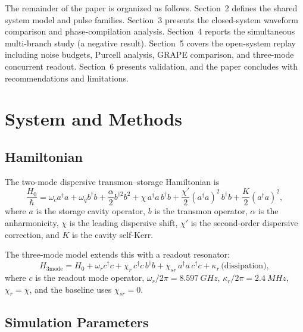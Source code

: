 \documentclass[aps,pra,twocolumn,reprint,amsmath,amssymb]{revtex4-2}
\begin{document}
The remainder of the paper is organized as follows. Section~2 defines the shared system model and pulse families. Section~3 presents the closed-system waveform comparison and phase-compilation analysis. Section~4 reports the simultaneous multi-branch study (a negative result). Section~5 covers the open-system replay including noise budgets, Purcell analysis, GRAPE comparison, and three-mode concurrent readout. Section~6 presents validation, and the paper concludes with recommendations and limitations.

\section{System and Methods}

\subsection{Hamiltonian}

The two-mode dispersive transmon--storage Hamiltonian is
\begin{equation}
\frac{H_0}{\hbar} = \omega_c a^\dagger a + \omega_q b^\dagger b + \frac{\alpha}{2}b^{\dagger 2}b^2 + \chi\,a^\dagger a\,b^\dagger b + \frac{\chi'}{2}(a^\dagger a)^2\,b^\dagger b + \frac{K}{2}(a^\dagger a)^2,
\label{eq:hamiltonian}
\end{equation}
where $a$ is the storage cavity operator, $b$ is the transmon operator, $\alpha$ is the anharmonicity, $\chi$ is the leading dispersive shift, $\chi'$ is the second-order dispersive correction, and $K$ is the cavity self-Kerr.

The three-mode model extends this with a readout resonator:
\begin{equation}
H_\mathrm{3mode} = H_0 + \omega_r c^\dagger c + \chi_r\,c^\dagger c\,b^\dagger b + \chi_{sr}\,a^\dagger a\,c^\dagger c + \kappa_r\,\text{(dissipation)},
\end{equation}
where $c$ is the readout mode operator, $\omega_r/2\pi = \SI{8.597}{GHz}$, $\kappa_r/2\pi = \SI{2.4}{MHz}$, $\chi_r = \chi$, and the baseline uses $\chi_{sr}=0$.

\subsection{Simulation Parameters}
\end{document}
